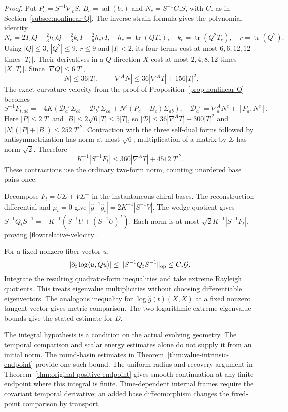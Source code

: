 \documentclass[11pt]{article}
\numberwithin{equation}{section}
\theoremstyle{definition}
\theoremstyle{remark}
\DeclareMathOperator{\tr}{tr}
\begin{document}
\begin{proof}
Put $P_c=S^{-1}\nabla_cS$, $B_c=\operatorname{ad}(b_c)$ and
$N_c=S^{-1}C_cS$, with $C_c$ as in Section~\ref{subsec:nonlinear-Q}.
The inverse strain formula gives the polynomial identity
\[
 N_c=2T_cQ-\tfrac23h_cQ-\tfrac23k_cI+\tfrac29h_c rI,
 \quad h_c=\tr(QT_c),\quad k_c=\tr(Q^2T_c),\quad r=\tr(Q^2).
\]
Using $|Q|\leq3$, $|Q^2|\leq9$, $r\leq9$ and $|I|<2$, its four
terms cost at most $6,6,12,12$ times $|T_c|$.
Their derivatives in a $Q$ direction $X$ cost at most
$2,4,8,12$ times $|X||T_c|$. Since $|\nabla Q|\leq6|T|$,
\[
 |N|\leq36|T|,\qquad
 |\nabla^A N|\leq36|\nabla^A T|+156|T|^2.
\]
The exact curvature velocity from the proof of
Proposition~\ref{prop:nonlinear-Q} becomes
\[
 S^{-1}F_{t,ab}=-4K\left(\mathcal D_a{}^c\Sigma_{cb}
   -\mathcal D_b{}^c\Sigma_{ca}+N^c(P_c+B_c)\Sigma_{ab}\right),
 \quad \mathcal D_a{}^c=\nabla_a^A N^c+[P_a,N^c].
\]
Here $|P|\leq2|T|$ and $|B|\leq2\sqrt6|T|\leq5|T|$, so
$|\mathcal D|\leq36|\nabla^A T|+300|T|^2$ and
$|N|(|P|+|B|)\leq252|T|^2$.
Contraction with the three self-dual forms followed by antisymmetrization
has norm at most $\sqrt6$; multiplication of a matrix by $\Sigma$ has
norm $\sqrt2$. Therefore
\begin{equation}\label{flow:relative-curvature}
 K^{-1}|S^{-1}F_t|\leq360|\nabla^A T|+4512|T|^2.
\end{equation}
These contractions use the ordinary two-form norm, counting unordered
base pairs once.

Decompose $F_t=U\Sigma+V\Sigma^-$ in the instantaneous chiral bases.
The reconstruction differential and $\mu_t=0$ give
$|\widehat g^{-1}\widehat g_t|=2K^{-1}|S^{-1}V|$.
The wedge quotient gives
$S^{-1}Q_tS^{-1}=-K^{-1}(S^{-1}U+(S^{-1}U)^T)$.
Each norm is at most $\sqrt2 K^{-1}|S^{-1}F_t|$, proving
\eqref{flow:relative-velocity}.

For a fixed nonzero fiber vector $u$,
\[
 |\partial_t\log\langle u,Qu\rangle|
 \leq\|S^{-1}Q_tS^{-1}\|_{\rm op}\leq C_*\mathcal G.
\]
Integrate the resulting quadratic-form inequalities and take extreme
Rayleigh quotients. This treats eigenvalue multiplicities without
choosing differentiable eigenvectors. The analogous inequality for
$\log\widehat g(t)(X,X)$ at a fixed nonzero tangent vector gives metric
comparison. The two logarithmic extreme-eigenvalue bounds give the
stated estimate for $D$.
\end{proof}

The integral hypothesis is a condition on the actual evolving geometry.
The temporal comparison and scalar energy estimates alone do not
supply it from an initial norm. The round-basin estimates in
Theorem~\ref{thm:value-intrinsic-endpoint} provide one such bound.
The uniform-radius and recovery argument in
Theorem~\ref{thm:original-positive-endpoint} gives smooth
continuation at any finite endpoint where this integral is finite. Time-dependent
internal frames require the covariant temporal derivative; an added base
diffeomorphism changes the fixed-point comparison by transport.
\end{document}
